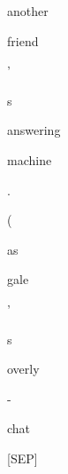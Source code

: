 \documentclass[varwidth=150mm]{standalone}
\begin{document}
\begin{CJK*}{UTF8}{gbsn}
{{{\colorbox{red!1.9640597105026245}{\strut another} \colorbox{red!1.9056674242019653}{\strut friend} \colorbox{red!0.0}{\strut '} \colorbox{red!0.0}{\strut s} \colorbox{red!1.9964648485183716}{\strut answering} \colorbox{red!2.6690125465393066}{\strut machine} \colorbox{red!0.0}{\strut .} \colorbox{red!14.538209915161133}{\strut (} \colorbox{red!10.118968963623047}{\strut as} \colorbox{red!2.52404522895813}{\strut gale} \colorbox{red!4.843481540679932}{\strut '} \colorbox{red!4.279101371765137}{\strut s} \colorbox{red!0.0}{\strut overly} \colorbox{red!5.612257480621338}{\strut -} \colorbox{red!0.0}{\strut chat} \colorbox{red!16.960107803344727}{\strut [SEP]}
}}}
\end{CJK*}
\end{document}
